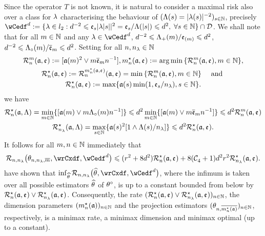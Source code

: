 \begin{rmk} Since the operator $T$ is not known, it is natural to
  consider a maximal risk also over a class for $\edf$ characterising the behaviour of
  $\Nsuite[s]{\iSv[s]= \vert \fedf[(s)] \vert ^{-2}}$, precisely $\rwCedf:=\{\edf\in\lp[2]:\edfCr^{-2}\leq\edfCw[s] \vert \fedf[ \vert s \vert ] \vert ^{2}=
\edfCw[s]/\iSv[ \vert s \vert ]\leq \edfCr^{2},\;\forall s\in\Nz\}\cap\cD$.
We shall note that for all $\Di\in\Nz$ and any $\edf\in\rwCedf$,
$\edfCr^{-2}\leq\miSv/\edfCwm\leq \edfCr^{2}$,
$\edfCr^{-2}\leq\oiSv/\edfCwo\leq \edfCr^{2}$. Setting
for all $\ssY,\ssE\in\Nz$
\begin{multline}
 \dRa{\Di}{\xdfCw[],\edfCw[]}:=[\xdfCw^2\vee\Di\edfCwo \ssY^{-1}],
\hfill
\mnDi(\xdfCw[],\edfCw[]):=\argmin\Nset[{\Di\in\Nz}]{\dRa{\Di}{\xdfCw[],\edfCw[]}},\hfill\\\mnRa{\xdfCw[],\edfCw[]}:=\dRa{\mnDi({\xdfCw[],\edfCw[]})}{\xdfCw[],\edfCw[]}=\min\Nset[{\Di\in\Nz}]{\dRa{\Di}{\xdfCw[],\edfCw[]}}\quad\text{
  and }\\
\mnRa{\xdfCw[],\edfCw[]}:=\max\{\xdfCw[(s)]\min(1,\edfCw[s]/\ssE),s\in\Nz\}.
\end{multline}
we have 
\begin{multline}
 \mnRa{\xdfCw[],\Lambda}=\min_{\Di\in\Nz}\{[\xdfCw\vee\Di\oiSv\ssY^{-1}]\}\leq
 \edfCr^2\min_{\Di\in\Nz}\{[\xdfCw\vee\Di\edfCwo\ssY^{-1}]\}\leq \edfCr^2\dRa{\Di}{\xdfCw[],\edfCw[]}\\ 
  \mmRa{\xdfCw[],\Lambda}=\max_{s\in\Nz}\{\xdfCw[(s)]^2[1\wedge \iSv[s]/\ssE]\}\leq\edfCr^2\mnRa{\xdfCw[],\edfCw[]}.
\end{multline}
It follows for all $\Di,\ssY\in\Nz$ immediately that 
\begin{equation}
  \nmRi{\hxdfPr}{\rwCxdf,\rwCedf}
  \leq (\xdfCr^2+8\edfCr^2) \mnRa{\xdfCw[],\edfCw[]}
+8(\cst{4}+1)\edfCr^2\xdfCr^2\mmRa{\xdfCw[],\edfCw[]}.
\end{equation}
 have shown  that
  $\inf_{\hxdf}\nmRi{\hxdf}{\rwCxdf,\rwCedf}$, where the infimum is taken over all
  possible estimators $\hxdf$ of $\xdf$, is up to a constant bounded
  from below by $\mnRa{\xdfCw[],\edfCw[]}\vee\mmRa{\xdfCw[],\edfCw[]} $.  Consequently, the rate
  $\Nsuite[n]{\mnRa{\xdfCw[],\edfCw[]}\vee\mmRa{\xdfCw[],\edfCw[]}}$, the dimension parameters $\Nsuite[n]{\mnDi(\xdfCw[])}$
  and the projection estimators $\Nsuite[n]{\txdfPr[\mnDi({\xdfCw[]})]}$, respectively, is a
  minimax rate, a minimax dimension and minimax optimal (up to a
  constant).
\remEnd
\end{rmk}


